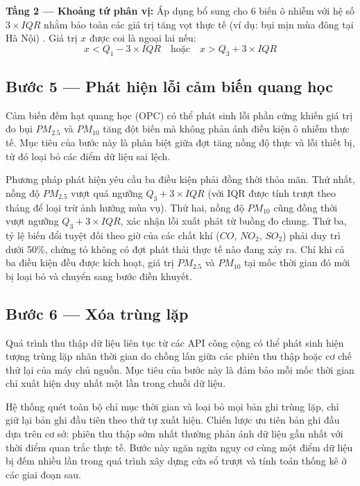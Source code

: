 \textbf{Tầng 2 --- Khoảng tứ phân vị:} Áp dụng bổ sung cho 6 biến ô nhiễm với hệ số $3 \times IQR$ nhằm bảo toàn các giá trị tăng vọt thực tế (ví dụ: bụi mịn mùa đông tại Hà Nội) \cite{tukey1977eda}. Giá trị $x$ được coi là ngoại lai nếu:
\begin{equation}
    x < Q_1 - 3 \times IQR \quad \text{hoặc} \quad x > Q_3 + 3 \times IQR
\end{equation}

\subsection{Bước 5 --- Phát hiện lỗi cảm biến quang học}

Cảm biến đếm hạt quang học (OPC) có thể phát sinh lỗi phần cứng khiến giá trị đo bụi $PM_{2.5}$ và $PM_{10}$ tăng đột biến mà không phản ánh điều kiện ô nhiễm thực tế. Mục tiêu của bước này là phân biệt giữa đợt tăng nồng độ thực và lỗi thiết bị, từ đó loại bỏ các điểm dữ liệu sai lệch.

Phương pháp phát hiện yêu cầu ba điều kiện phải đồng thời thỏa mãn. Thứ nhất, nồng độ $PM_{2.5}$ vượt quá ngưỡng $Q_3 + 3 \times IQR$ (với IQR được tính trượt theo tháng để loại trừ ảnh hưởng mùa vụ). Thứ hai, nồng độ $PM_{10}$ cũng đồng thời vượt ngưỡng $Q_3 + 3 \times IQR$, xác nhận lỗi xuất phát từ buồng đo chung. Thứ ba, tỷ lệ biến đổi tuyệt đối theo giờ của các chất khí ($CO$, $NO_2$, $SO_2$) phải duy trì dưới 50\%, chứng tỏ không có đợt phát thải thực tế nào đang xảy ra. Chỉ khi cả ba điều kiện đều được kích hoạt, giá trị $PM_{2.5}$ và $PM_{10}$ tại mốc thời gian đó mới bị loại bỏ và chuyển sang bước điền khuyết.

\subsection{Bước 6 --- Xóa trùng lặp}

Quá trình thu thập dữ liệu liên tục từ các API công cộng có thể phát sinh hiện tượng trùng lặp nhãn thời gian do chồng lấn giữa các phiên thu thập hoặc cơ chế thử lại của máy chủ nguồn. Mục tiêu của bước này là đảm bảo mỗi mốc thời gian chỉ xuất hiện duy nhất một lần trong chuỗi dữ liệu.

Hệ thống quét toàn bộ chỉ mục thời gian và loại bỏ mọi bản ghi trùng lặp, chỉ giữ lại bản ghi đầu tiên theo thứ tự xuất hiện. Chiến lược ưu tiên bản ghi đầu dựa trên cơ sở: phiên thu thập sớm nhất thường phản ánh dữ liệu gần nhất với thời điểm quan trắc thực tế. Bước này ngăn ngừa nguy cơ cùng một điểm dữ liệu bị đếm nhiều lần trong quá trình xây dựng cửa sổ trượt và tính toán thống kê ở các giai đoạn sau.


